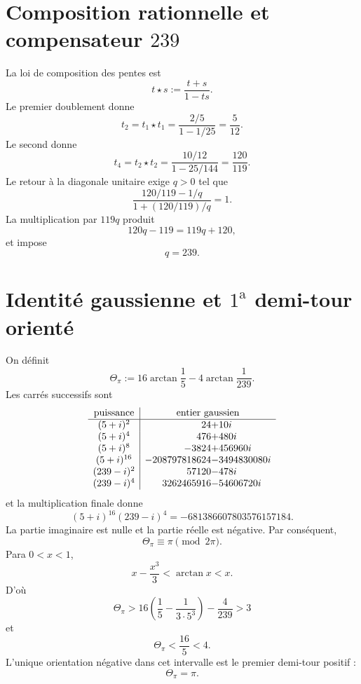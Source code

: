 \section{Composition rationnelle et compensateur \texorpdfstring{\(239\)}{239}}

La loi de composition des pentes est
\[
 t\star s:=\frac{t+s}{1-ts}.
\]
Le premier doublement donne
\[
 t_2=t_1\star t_1
 =\frac{2/5}{1-1/25}
 =\frac5{12}.
\]
Le second donne
\[
 t_4=t_2\star t_2
 =\frac{10/12}{1-25/144}
 =\frac{120}{119}.
\]
Le retour à la diagonale unitaire exige \(q>0\) tel que
\[
 \frac{120/119-1/q}{1+(120/119)/q}=1.
\]
La multiplication par \(119q\) produit
\[
 120q-119=119q+120,
\]
et impose
\begin{equation}
 \boxed{q=239.}
 \label{gfp:b:eq:compensador-239-pi}
\end{equation}

\section{Identité gaussienne et \(1^{\mathrm a}\) demi-tour orienté}

On définit
\begin{equation}
 \Theta_\pi
 :=16\arctan\frac15-4\arctan\frac1{239}.
 \label{gfp:b:eq:theta-pi-autonoma}
\end{equation}
Les carrés successifs sont
\[
\begin{array}{c|r@{}l}
\text{puissance}&\multicolumn{2}{c}{\text{entier gaussien}}\\ \hline
(5+i)^2&24&+10i\\
(5+i)^4&476&+480i\\
(5+i)^8&-3824&+456960i\\
(5+i)^{16}&-208797818624&-3494830080i\\
(239-i)^2&57120&-478i\\
(239-i)^4&3262465916&-54606720i
\end{array}
\]
et la multiplication finale donne
\begin{equation}
 \boxed{
 (5+i)^{16}(239-i)^4
 =-681386607803576157184.}
 \label{gfp:b:eq:identidad-gaussiana-pi-autonoma}
\end{equation}
La partie imaginaire est nulle et la partie réelle est négative. Par conséquent,
\[
 \Theta_\pi\equiv\pi\pmod{2\pi}.
\]
Para \(0<x<1\),
\[
 x-\frac{x^3}{3}<\arctan x<x.
\]
D’où
\[
 \Theta_\pi>
 16\left(\frac15-\frac1{3\cdot5^3}\right)-\frac4{239}>3
\]
et
\[
 \Theta_\pi<\frac{16}{5}<4.
\]
L’unique orientation négative dans cet intervalle est le premier demi-tour
positif :
\begin{equation}
 \boxed{\Theta_\pi=\pi.}
 \label{gfp:b:eq:reconocimiento-pi-exacto}
\end{equation}


